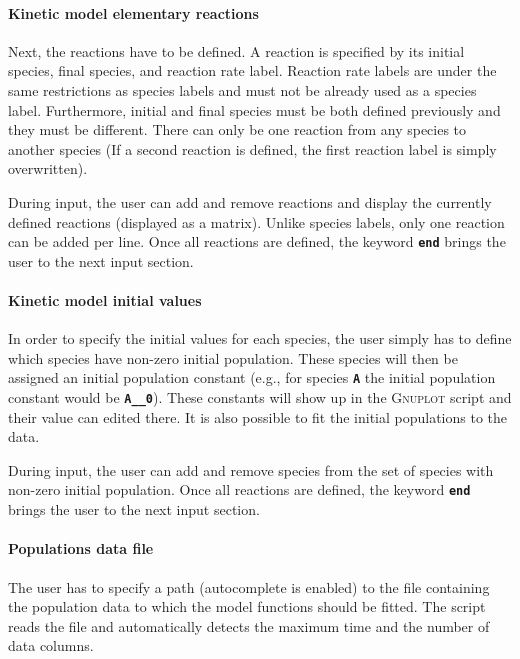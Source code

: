 \documentclass[a4paper,10pt,DIV=15,openany,twoside=false]{scrbook}
\newcommand{\ttt}[1]{\textbf{\texttt{#1}}}
\begin{document}
\paragraph{Kinetic model elementary reactions}

Next, the reactions have to be defined.
A reaction is specified by its initial species, final species, and reaction rate label.
Reaction rate labels are under the same restrictions as species labels and must not be already used as a species label.
Furthermore, initial and final species must be both defined previously and they must be different.
There can only be one reaction from any species to another species (If a second reaction is defined, the first reaction label is simply overwritten).

During input, the user can add and remove reactions and display the currently defined reactions (displayed as a matrix).
Unlike species labels, only one reaction can be added per line.
Once all reactions are defined, the keyword \ttt{end} brings the user to the next input section.

\paragraph{Kinetic model initial values}

In order to specify the initial values for each species, the user simply has to define which species have non-zero initial population.
These species will then be assigned an initial population constant (e.g., for species \ttt{A} the initial population constant would be \ttt{A\_\_0}).
These constants will show up in the \textsc{Gnuplot} script and their value can edited there.
It is also possible to fit the initial populations to the data.

During input, the user can add and remove species from the set of species with non-zero initial population.
Once all reactions are defined, the keyword \ttt{end} brings the user to the next input section.

\paragraph{Populations data file}

The user has to specify a path (autocomplete is enabled) to the file containing the population data to which the model functions should be fitted.
The script reads the file and automatically detects the maximum time and the number of data columns.
\end{document}
